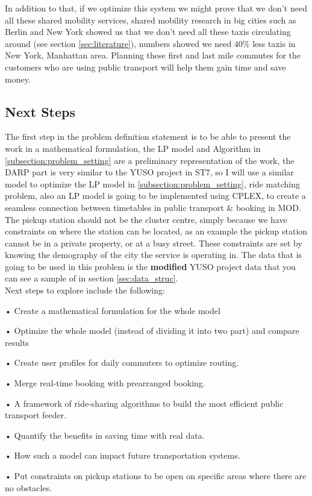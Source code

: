 \documentclass{article}
\begin{document}
In addition to that, if we optimize this system we might prove that we don\rq{t} need all these shared mobility services, shared mobility research in big cities such as Berlin and New York showed us that we don\rq{t} need all these
taxis circulating around (see section \ref{sec:literature}), numbers showed we need $40\%$ less taxis in New York, Manhattan area. Planning these first and last mile commutes for the customers who are using public transport will help them gain time and save money.


\subsection{Next Steps}
\label{subsec:next_steps}
The first step in the problem definition statement is to be able to present the work in a mathematical formulation, the LP model and Algorithm in \ref{subsection:problem_setting}  are a preliminary representation of the work, the DARP part is very similar to the YUSO project in ST7, so I will use a similar model to optimize the LP model in \ref{subsection:problem_setting}, ride matching problem, also an LP model is going to be implemented using CPLEX, to create a seamless connection between timetables in public transport \& booking in MOD. The pickup station should not be the cluster centre, simply because we have constraints on where the station can be located, as an example the pickup station cannot be in a private property, or at a busy street.
These constraints are set by knowing the demography of the city the service is operating in. The data that is going to be used in this problem is the \textbf{modified} YUSO project data that you can see a sample of in section \ref{sec:data_struc}. \\


Next steps to explore include the following:
\begin{list}{}
\item • Create a mathematical formulation for the whole model
\item • Optimize the whole model (instead of dividing it into two part) and compare results
\item • Create user profiles for daily commuters to optimize routing.
\item • Merge real-time booking with prearranged booking.
\item • A framework of ride-sharing algorithms to build the most efficient public transport feeder.
\item • Quantify the benefits in saving time with real data. 
\item •  How such a model can impact future transportation systems.
\item • Put constraints on pickup stations to be open on specific areas where there are no obstacles.
\end{list}
\end{document}
